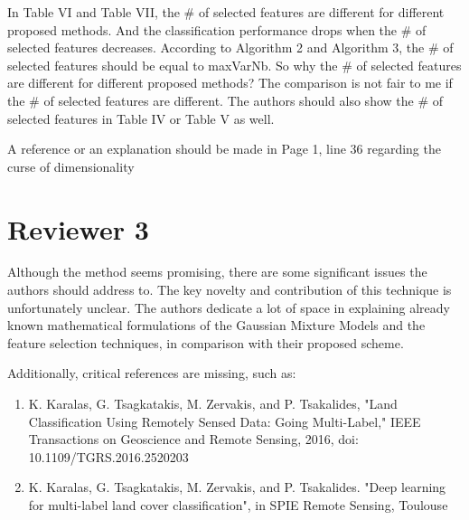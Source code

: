 \documentclass[a4paper,10pt,DIV=16]{scrartcl}
\begin{document}
\begin{revbox}
  In Table VI and Table VII, the \# of selected features are different for different proposed methods. And the classification performance drops when the \# of selected features decreases. According to Algorithm 2 and Algorithm 3, the \# of selected features should be equal to maxVarNb. So why the \# of selected features are different for different proposed methods? The comparison is not fair to me if the \# of selected features are different. The authors should also show the \# of selected features in Table IV or Table V as well.
  \begin{resbox}

  \end{resbox}
\end{revbox}

\begin{revbox}
  A reference or an explanation should be made in Page 1, line 36 regarding the curse of dimensionality
  \begin{resbox}

  \end{resbox}
\end{revbox}

\section{Reviewer 3}


\begin{revbox}
  Although the method seems promising, there are some significant issues the authors should address to. The key novelty and contribution of this technique is unfortunately unclear. The authors dedicate a lot of space in explaining already known mathematical formulations of the Gaussian Mixture Models and the feature selection techniques, in comparison with their proposed scheme.
  \begin{resbox}

  \end{resbox}
\end{revbox}

\begin{revbox}
  Additionally, critical references are missing, such as:
  \begin{enumerate}
  \item K. Karalas, G. Tsagkatakis, M. Zervakis, and P. Tsakalides, "Land Classification Using Remotely Sensed Data: Going Multi-Label," IEEE Transactions on Geoscience and Remote Sensing, 2016, doi: 10.1109/TGRS.2016.2520203
  \item K. Karalas, G. Tsagkatakis, M. Zervakis, and P. Tsakalides. "Deep learning for multi-label land cover classification", in SPIE Remote Sensing, Toulouse
  \end{enumerate}

  \begin{resbox}

  \end{resbox}
\end{revbox}
\end{document}
